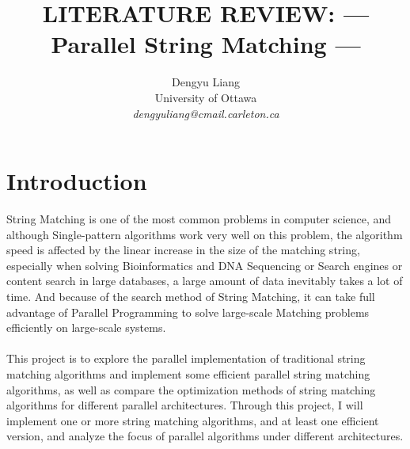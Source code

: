 \documentclass[11pt]{article}       %
\begin{document}


\title{LITERATURE REVIEW: --- Parallel String Matching ---}


\author{
Dengyu Liang\\
University of Ottawa\\
{\em dengyuliang@cmail.carleton.ca}
} %

\maketitle



\section{Introduction} \label{intro}

String Matching is one of the most common problems in computer science, and although Single-pattern algorithms work very well on this problem, the algorithm speed is affected by the linear increase in the size of the matching string, especially when solving Bioinformatics and DNA Sequencing or Search engines or content search in large databases, a large amount of data inevitably takes a lot of time. And because of the search method of String Matching, it can take full advantage of Parallel Programming to solve large-scale Matching problems efficiently on large-scale systems.\\
\\This project is to explore the parallel implementation of traditional string matching algorithms and implement some efficient parallel string matching algorithms, as well as compare the optimization methods of string matching algorithms for different parallel architectures. Through this project, I will implement one or more string matching algorithms, and at least one efficient version, and analyze the focus of parallel algorithms under different architectures.\\ 
\end{document}
